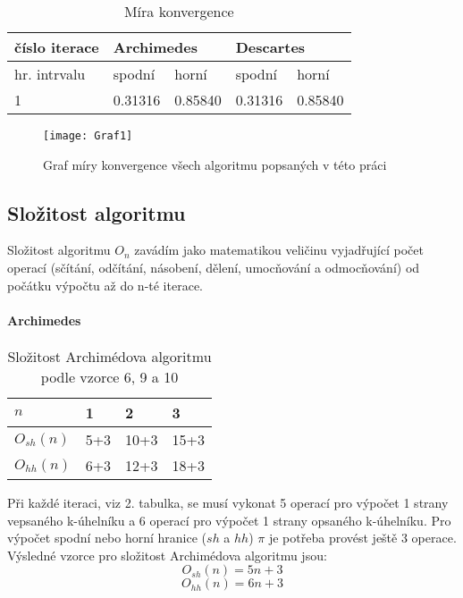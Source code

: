 \documentclass[rocnikovka]{gzwroc} %
\begin{document}

\begin{table}[h!]
\caption{Míra konvergence}
\begin{tabular}{|l|l|l|l|l|}
\hline
\multicolumn{1}{|l|}{\bfseries číslo iterace} & \multicolumn{2}{l|}{\bfseries Archimedes} & \multicolumn{2}{l|}{\bfseries Descartes} \\ \hline
\multicolumn{1}{|l|}{hr. intrvalu} & \multicolumn{1}{l|}{spodní} & \multicolumn{1}{l|}{horní} & \multicolumn{1}{l|}{spodní} & \multicolumn{1}{l|}{horní} \\ \hline \hline
1 &                  0.31316     &         0.85840              &                      0.31316 &            0.85840\\ \hline
         
\end{tabular}
\end{table}
\begin{figure}[!ht]
\texttt{[image: Graf1]}
\caption{Graf míry konvergence všech algoritmu popsaných v této práci}
\label{fig:graf1}
\end{figure}

\subsection{Složitost algoritmu}
Složitost algoritmu $O_n$ zavádím jako matematikou veličinu vyjadřující počet operací (sčítání, odčítání, násobení, dělení, umocňování a odmocňování) od počátku výpočtu až do n-té iterace.
\paragraph{Archimedes}
\begin{table}[h!]
\caption{Složitost Archimédova algoritmu podle vzorce 6, 9 a 10}
\begin{tabular}{|l||l|l|l|}
\hline
$n$ & 1&2&3 \\ \hline
$O_{sh}(n)$&5+3&10+3&15+3 \\ \hline
$O_{hh}(n)$&6+3&12+3&18+3 \\ \hline
\end{tabular}
\end{table}
Při každé iteraci, viz 2. tabulka, se musí vykonat 5 operací pro výpočet 1 strany vepsaného k-úhelníku a 6 operací pro výpočet 1 strany opsaného k-úhelníku. Pro výpočet spodní nebo horní hranice ($sh$ a $hh$) $\pi$ je potřeba provést ještě 3 operace. Výsledné vzorce pro složitost Archimédova algoritmu jsou:
$$
O_{sh}(n)=5n+3
$$
$$
O_{hh}(n)=6n+3
$$
\end{document}
